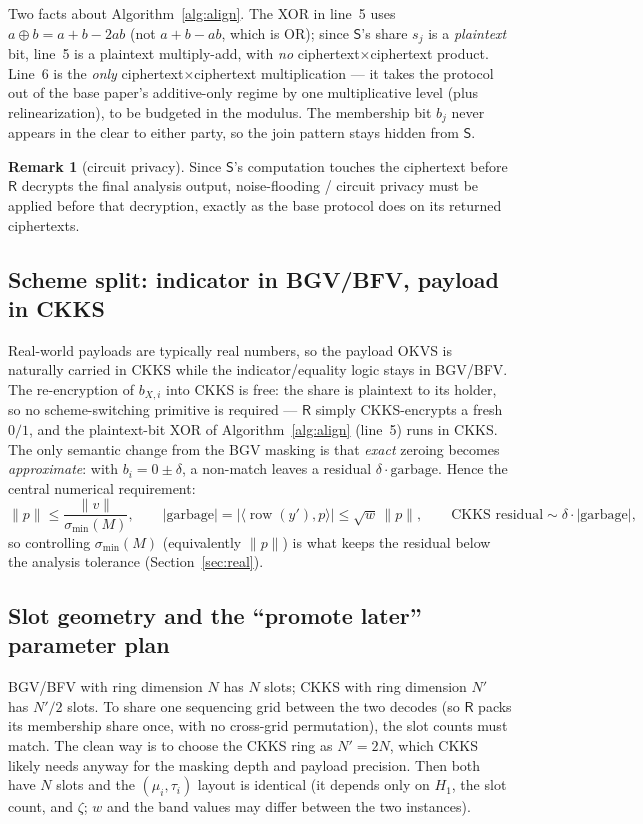 \documentclass[11pt]{article}
\newcommand{\Rcv}{\mathsf{R}}
\newcommand{\Snd}{\mathsf{S}}
\newcommand{\norm}[1]{\lVert #1 \rVert}
\newcommand{\sigmin}{\sigma_{\min}}
\DeclareMathOperator{\row}{row}
\theoremstyle{plain}
\theoremstyle{definition}
\newtheorem{remark}{Remark}
\begin{document}
Two facts about Algorithm~\ref{alg:align}. The XOR in line~5 uses $a\oplus b=a+b-2ab$ (not
$a+b-ab$, which is OR); since $\Snd$'s share $s_j$ is a \emph{plaintext} bit, line~5 is a
plaintext multiply-add, with \emph{no} ciphertext$\times$ciphertext product. Line~6 is the
\emph{only} ciphertext$\times$ciphertext multiplication --- it takes the protocol out of the
base paper's additive-only regime by one multiplicative level (plus relinearization), to be
budgeted in the modulus. The membership bit $b_j$ never appears in the clear to either party,
so the join pattern stays hidden from $\Snd$.

\begin{remark}[circuit privacy]
Since $\Snd$'s computation touches the ciphertext before $\Rcv$ decrypts the final analysis
output, noise-flooding / circuit privacy must be applied before that decryption, exactly as
the base protocol does on its returned ciphertexts.
\end{remark}

\subsection{Scheme split: indicator in BGV/BFV, payload in CKKS}
Real-world payloads are typically real numbers, so the payload OKVS is naturally carried in
CKKS while the indicator/equality logic stays in BGV/BFV. The re-encryption of $b_{X,i}$ into
CKKS is free: the share is plaintext to its holder, so no scheme-switching
primitive is required --- $\Rcv$ simply CKKS-encrypts a fresh $0/1$, and the plaintext-bit
XOR of Algorithm~\ref{alg:align} (line~5) runs in CKKS. The only semantic change from the BGV masking is that \emph{exact} zeroing becomes
\emph{approximate}: with $b_i=0\pm\delta$, a non-match leaves a residual $\delta\cdot
\text{garbage}$. Hence the central numerical requirement:
\[
  \norm{p}\le \frac{\norm{v}}{\sigmin(M)},\qquad
  |\text{garbage}|=|\langle\row(y'),p\rangle|\le \sqrt{w}\,\norm{p},\qquad
  \text{CKKS residual}\sim \delta\cdot|\text{garbage}|,
\]
so controlling $\sigmin(M)$ (equivalently $\norm{p}$) is what keeps the residual below the
analysis tolerance (Section~\ref{sec:real}).

\subsection{Slot geometry and the ``promote later'' parameter plan}
BGV/BFV with ring dimension $N$ has $N$ slots; CKKS with ring dimension $N'$ has $N'/2$
slots. To share one sequencing grid between the two decodes (so $\Rcv$ packs its membership
share once, with no cross-grid permutation), the slot counts must match. The clean way is to
choose the CKKS ring as $N'=2N$, which CKKS likely needs anyway for the masking depth and
payload precision. Then both have $N$ slots and the $(\mu_i,\tau_i)$ layout is identical
(it depends only on $H_1$, the slot count, and $\zeta$; $w$ and the band values may differ
between the two instances).
\end{document}
